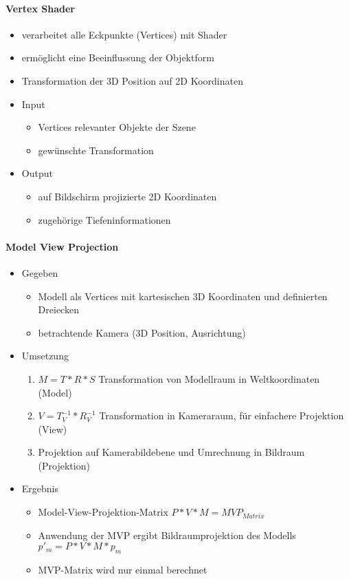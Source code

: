\documentclass[10pt,landscape]{article}
\begin{document}
\begin{multicols}{3}
\paragraph{Vertex Shader}
\begin{itemize}
  \item verarbeitet alle Eckpunkte (Vertices) mit Shader
  \item ermöglicht eine Beeinflussung der Objektform
  \item Transformation der 3D Position auf 2D Koordinaten
  \item Input
        \begin{itemize}
          \item Vertices relevanter Objekte der Szene
          \item gewünschte Transformation
        \end{itemize}
  \item Output
        \begin{itemize}
          \item auf Bildschirm projizierte 2D Koordinaten
          \item zugehörige Tiefeninformationen
        \end{itemize}
\end{itemize}

\paragraph{Model View Projection}
\begin{itemize}
  \item Gegeben
        \begin{itemize}
          \item Modell als Vertices mit kartesischen 3D Koordinaten und definierten Dreiecken
          \item betrachtende Kamera (3D Position, Ausrichtung)
        \end{itemize}
  \item Umsetzung
        \begin{enumerate}
          \item $M=T*R*S$ Transformation von Modellraum in Weltkoordinaten (Model)
          \item $V=T_V^{-1}*R_V^{-1}$ Transformation in Kameraraum, für einfachere Projektion (View)
          \item Projektion auf Kamerabildebene und Umrechnung in Bildraum (Projektion)
        \end{enumerate}
  \item Ergebnis
        \begin{itemize}
          \item Model-View-Projektion-Matrix $P*V*M=MVP_{Matrix}$
          \item Anwendung der MVP ergibt Bildraumprojektion des Modells $p'_m=P*V*M*p_m$
          \item MVP-Matrix wird nur einmal berechnet
        \end{itemize}
\end{itemize}


\end{multicols}
\end{document}
